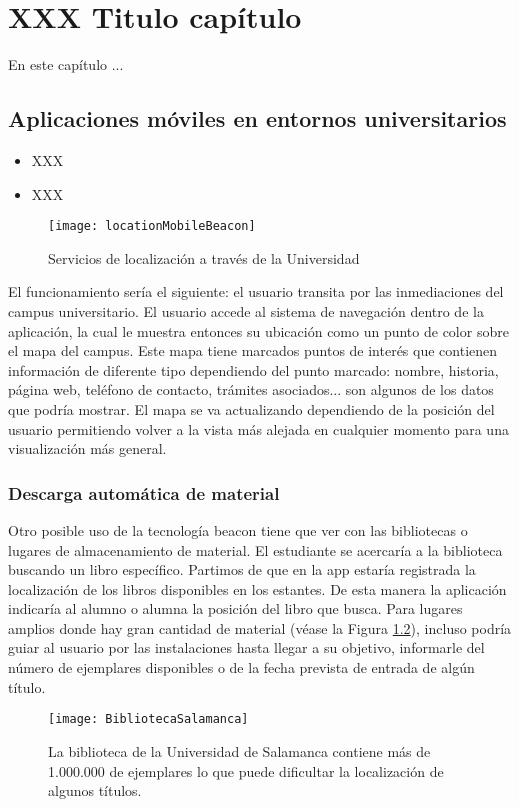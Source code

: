 %
%
%
%

\chapter{XXX Titulo capítulo} \label{chap:BeaconsEntornosUniversitarios}  


En este capítulo ...

 
\section{Aplicaciones móviles en entornos universitarios}


\begin{itemize}
\item XXX
\item XXX
\end{itemize}

\begin{figure}[h]
	\centering
	\texttt{[image: locationMobileBeacon]}
	\caption{Servicios de localización a través de la Universidad}
	\label{fig:beaconLocation}
\end{figure}

El funcionamiento sería el siguiente: el usuario transita por las inmediaciones del campus universitario. El usuario accede al sistema de navegación dentro de la aplicación, la cual le muestra entonces su ubicación como un punto de color sobre el mapa del campus. Este mapa tiene marcados puntos de interés que contienen información de diferente tipo dependiendo del punto marcado: nombre, historia, página web, teléfono de contacto, trámites asociados... son algunos de los datos que podría mostrar. El mapa se va actualizando dependiendo de la posición del usuario permitiendo volver a la vista más alejada en cualquier momento para una visualización más general.


\subsection{Descarga automática de material} \label{sec:descargaautomatica}



Otro posible uso de la tecnología beacon tiene que ver con las bibliotecas o lugares de almacenamiento de material. El estudiante se acercaría a la biblioteca buscando un libro específico. Partimos de que en la app estaría registrada la localización de los libros disponibles en los estantes. De esta manera la aplicación indicaría al alumno o alumna la posición del libro que busca. Para lugares amplios donde hay gran cantidad de material (véase la Figura \ref{fig:bibliotecaUSAL}), incluso podría guiar al usuario por las instalaciones hasta llegar a su objetivo, informarle del número de ejemplares disponibles o de la fecha prevista de entrada de algún título.

\begin{figure}[H]
	\centering
	\texttt{[image: BibliotecaSalamanca]}
	\caption{La biblioteca de la Universidad de Salamanca contiene más de 1.000.000 de ejemplares lo que puede dificultar la localización de algunos títulos.}
	\label{fig:bibliotecaUSAL}
\end{figure}
